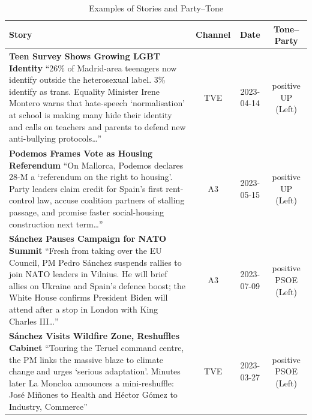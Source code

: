 \documentclass[12pt]{article}
\begin{document}
\clearpage






















\begin{longtable}{|p{8cm}|c|c|c|}
\caption{Examples of Stories and Party–Tone} \\
\hline
\textbf{Story} & \textbf{Channel} & \textbf{Date} & \textbf{Tone–Party}\\
\hline
\textbf{Teen Survey Shows Growing LGBT Identity}\newline
{\scriptsize
	“26\% of Madrid-area teenagers now identify outside the heterosexual label. 3\% identify as trans.  
	Equality Minister Irene Montero warns that hate-speech ‘normalisation’ at school is making many hide their identity and calls on teachers and parents to defend new anti-bullying protocols…”}
& TVE & 2023-04-14 & positive UP (Left)\\
\hline
\textbf{Podemos Frames Vote as Housing Referendum}\newline
{\scriptsize
	“On Mallorca, Podemos declares 28-M a ‘referendum on the right to housing’.  
	Party leaders claim credit for Spain’s first rent-control law, accuse coalition partners of stalling passage, and promise faster social-housing construction next term…”}
& A3 & 2023-05-15 & positive UP (Left)\\
\hline
\textbf{Sánchez Pauses Campaign for NATO Summit}\newline
{\scriptsize
	“Fresh from taking over the EU Council, PM Pedro Sánchez suspends rallies to join NATO leaders in Vilnius.  
	He will brief allies on Ukraine and Spain’s defence boost; the White House confirms President Biden will attend after a stop in London with King Charles III…”}
& A3 & 2023-07-09 & positive PSOE (Left)\\
\hline
\textbf{Sánchez Visits Wildfire Zone, Reshuffles Cabinet}\newline
{\scriptsize
	“Touring the Teruel command centre, the PM links the massive blaze to climate change and urges ‘serious adaptation’.  
	Minutes later La Moncloa announces a mini-reshuffle: José Miñones to Health and Héctor Gómez to Industry, Commerce”}
& TVE & 2023-03-27 & positive PSOE (Left)\\

\end{longtable}
\end{document}
